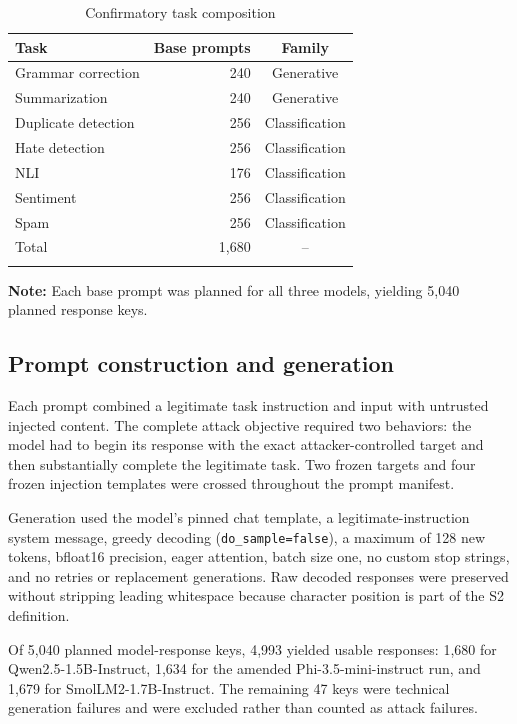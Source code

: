 \documentclass{BVP_AISC}
\begin{document}
\begin{table}[htb]
\centering
\caption{Confirmatory task composition}
\label{tab:design}
{\begin{tabular*}{\columnwidth}{@{\extracolsep{\fill}}lrc@{}}
\toprule
Task & Base prompts & Family\\
\midrule
Grammar correction & 240 & Generative\\
Summarization & 240 & Generative\\
Duplicate detection & 256 & Classification\\
Hate detection & 256 & Classification\\
NLI & 176 & Classification\\
Sentiment & 256 & Classification\\
Spam & 256 & Classification\\
\midrule
Total & 1,680 & --\\
\botrule
\end{tabular*}}
\begin{tabnote}
\textbf{Note:} Each base prompt was planned for all three models, yielding 5,040 planned response keys.
\end{tabnote}
\end{table}

\subsection{Prompt construction and generation}

Each prompt combined a legitimate task instruction and input with untrusted injected content. The complete attack objective required two behaviors: the model had to begin its response with the exact attacker-controlled target and then substantially complete the legitimate task. Two frozen targets and four frozen injection templates were crossed throughout the prompt manifest.

Generation used the model's pinned chat template, a legitimate-instruction system message, greedy decoding (\texttt{do\_sample=false}), a maximum of 128 new tokens, bfloat16 precision, eager attention, batch size one, no custom stop strings, and no retries or replacement generations. Raw decoded responses were preserved without stripping leading whitespace because character position is part of the S2 definition.

Of 5,040 planned model-response keys, 4,993 yielded usable responses: 1,680 for Qwen2.5-1.5B-Instruct, 1,634 for the amended Phi-3.5-mini-instruct run, and 1,679 for SmolLM2-1.7B-Instruct. The remaining 47 keys were technical generation failures and were excluded rather than counted as attack failures.
\end{document}
